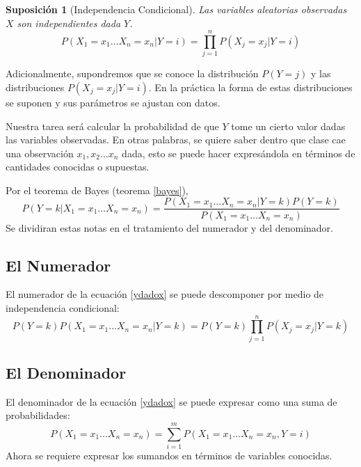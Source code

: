 \documentclass[11pt,spanish]{article}
\newtheorem{assumption}[theorem]{Suposición}
\begin{document}
\begin{assumption}[Independencia Condicional]\label{independencia}
	Las variables aleatorias observadas \(X\) son independientes dada \(Y\). 
	\[P(X_1=x_1 \ldots X_n=x_n|Y=i) = \prod_{j=1}^{n} P(X_j=x_j|Y=i)\]
\end{assumption}

Adicionalmente, supondremos que se conoce la distribución $P(Y=j)$ y las distribuciones $P(X_j=x_j|Y=i)$. 
En la práctica la forma de estas distribuciones se suponen y sus parámetros se ajustan con datos.

Nuestra tarea será calcular la probabilidad de que $Y$ tome un cierto valor dadas las variables observadas. 
En otras palabras, se quiere saber dentro que clase cae una observación $x_1,x_2 \ldots x_n$ dada, esto se puede 
hacer expresándola en términos de cantidades conocidas o supuestas.

Por el teorema de Bayes (teorema \ref{bayes}),
\begin{equation}
	\label{ydadox}
	P(Y=k|X_1=x_1 \ldots X_n=x_n) = \frac{ P(X_1=x_1 \ldots X_n=x_n|Y=k) P(Y=k) }{P(X_1=x_1 \ldots X_n=x_n)}
\end{equation}
Se dividiran estas notas en el tratamiento del numerador y del denominador. 

\subsection{El Numerador}

El numerador de la ecuación \ref{ydadox} se puede descomponer por medio de independencia condicional:
\begin{equation}
	\label{ydadoxUp}
	P(Y=k) P(X_1=x_1 \ldots X_n=x_n|Y=k) = P(Y=k) \prod_{j=1}^{n} P(X_j=x_j|Y=k) 
\end{equation}

\subsection{El Denominador}

El denominador de la ecuación \ref{ydadox} se puede expresar como una suma de probabilidades:
\begin{equation}
	\label{ydadoxDownInter}
	P(X_1=x_1 \ldots X_n=x_n) = \sum_{i=1}^{m} P(X_1=x_1 \ldots X_n=x_n, Y=i)
\end{equation}
Ahora se requiere expresar los sumandos en términos de variables conocidas.
\end{document}
